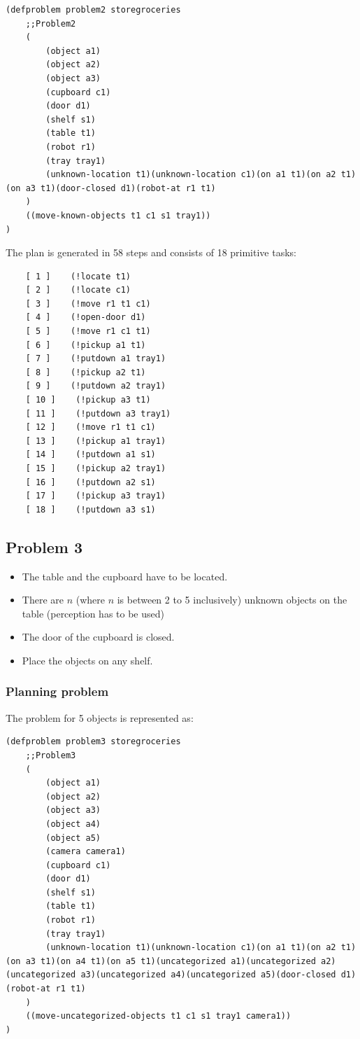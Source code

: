 \documentclass[paper=a4, fontsize=11pt]{scrartcl}
\begin{document}
	\begin{lstlisting}
(defproblem problem2 storegroceries
	;;Problem2
	(
		(object a1)
		(object a2)
		(object a3)
		(cupboard c1)
		(door d1)
		(shelf s1)
		(table t1)
		(robot r1)
		(tray tray1)
		(unknown-location t1)(unknown-location c1)(on a1 t1)(on a2 t1)(on a3 t1)(door-closed d1)(robot-at r1 t1)
	)
	((move-known-objects t1 c1 s1 tray1))
)
	\end{lstlisting}

	\vspace{5mm}

	The plan is generated in 58 steps and consists of 18 primitive tasks: \\

	\begin{lstlisting}
	[ 1 ]    (!locate t1)
	[ 2 ]    (!locate c1)
	[ 3 ]    (!move r1 t1 c1)
	[ 4 ]    (!open-door d1)
	[ 5 ]    (!move r1 c1 t1)
	[ 6 ]    (!pickup a1 t1)
	[ 7 ]    (!putdown a1 tray1)
	[ 8 ]    (!pickup a2 t1)
	[ 9 ]    (!putdown a2 tray1)
	[ 10 ]    (!pickup a3 t1)
	[ 11 ]    (!putdown a3 tray1)
	[ 12 ]    (!move r1 t1 c1)
	[ 13 ]    (!pickup a1 tray1)
	[ 14 ]    (!putdown a1 s1)
	[ 15 ]    (!pickup a2 tray1)
	[ 16 ]    (!putdown a2 s1)
	[ 17 ]    (!pickup a3 tray1)
	[ 18 ]    (!putdown a3 s1)
	\end{lstlisting}

	\subsection{Problem 3}

		\begin{itemize}
			\item The table and the cupboard have to be located.
			\item There are $n$ (where $n$ is between 2 to 5 inclusively) unknown objects on the table (perception has to be used)
			\item The door of the cupboard is closed.
			\item Place the objects on any shelf.
		\end{itemize}

	\subsubsection*{Planning problem}

	The problem for 5 objects is represented as: \\

	\begin{lstlisting}
(defproblem problem3 storegroceries
	;;Problem3
	(
		(object a1)
		(object a2)
		(object a3)
		(object a4)
		(object a5)
		(camera camera1)
		(cupboard c1)
		(door d1)
		(shelf s1)
		(table t1)
		(robot r1)
		(tray tray1)
		(unknown-location t1)(unknown-location c1)(on a1 t1)(on a2 t1)(on a3 t1)(on a4 t1)(on a5 t1)(uncategorized a1)(uncategorized a2)(uncategorized a3)(uncategorized a4)(uncategorized a5)(door-closed d1)(robot-at r1 t1)
	)
	((move-uncategorized-objects t1 c1 s1 tray1 camera1))
)
	\end{lstlisting}
\end{document}
